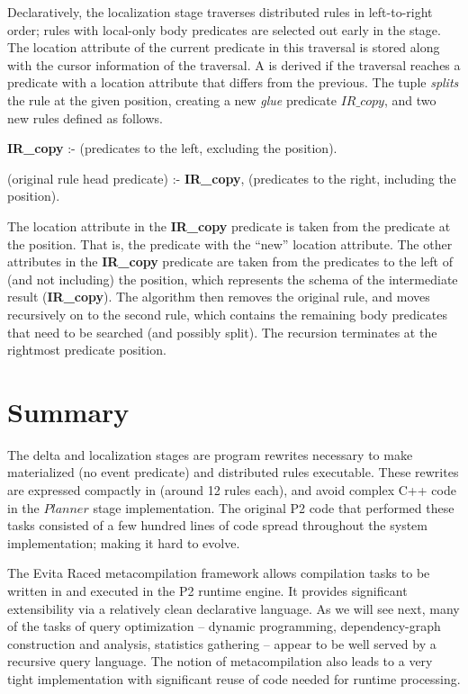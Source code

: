 Declaratively, the localization stage traverses distributed rules in
left-to-right order; rules with local-only body predicates are selected out
early in the stage.  The location attribute of the current predicate in this
traversal is stored along with the cursor information of the traversal.  A
 is derived if the traversal reaches a predicate with a location
attribute that differs from the previous.  The  tuple {\em splits}
the rule at the given position, creating a new {\em glue} predicate $IR\_copy$,
and two new rules defined as follows.
\begin{CompactEnumerate} 
\item {\bf IR\_copy} :- (predicates to the left, excluding the  position).  
\item (original rule head predicate) :- {\bf IR\_copy}, (predicates to the right, including
  the  position).  
\end{CompactEnumerate} 
The location attribute in the {\bf IR\_copy} predicate is taken from the
predicate at the  position.  That is, the predicate with the
``new'' location attribute.  The other attributes in the {\bf IR\_copy}
predicate are taken from the predicates to the left of (and not including) the
 position, which represents the schema of the intermediate result
({\bf IR\_copy}).  The algorithm then removes the original rule, and moves
recursively on to the second rule, which contains the remaining body predicates
that need to be searched (and possibly split).  The recursion terminates at the
rightmost predicate position.

\section{Summary} 
\label{ch:evita:sec:summary} 

The delta and localization stages are program rewrites necessary to make
materialized (no event predicate) and distributed rules executable.  These
rewrites are expressed compactly in \OVERLOG (around 12 rules each), and
avoid complex C++ code in the $Planner$ stage implementation.  The original
P2 code that performed these tasks consisted of a few hundred lines of code
spread throughout the system implementation; making it hard to evolve.

The Evita Raced metacompilation framework allows \OVERLOG compilation tasks to
be written in \OVERLOG and executed in the P2 runtime engine.  It provides
significant extensibility via a relatively clean declarative language.  As we
will see next, many of the tasks of query optimization -- dynamic programming,
dependency-graph construction and analysis, statistics gathering -- appear to
be well served by a recursive query language.  The notion of metacompilation
also leads to a very tight implementation with significant reuse of code needed
for runtime processing.



